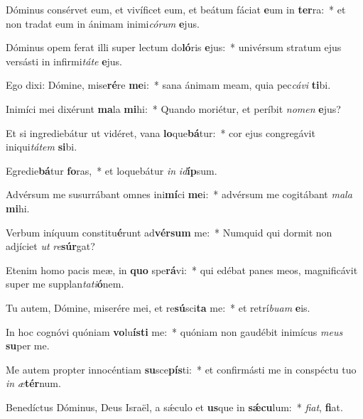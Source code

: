 \item Dóminus consérvet eum, et vivíficet eum, et beátum fáciat \textbf{e}um in \textbf{ter}ra:~* et non tradat eum in ánimam inimi\textit{có}\textit{rum} \textbf{e}jus.
\item Dóminus opem ferat illi super lectum do\textbf{ló}ris \textbf{e}jus:~* univérsum stratum ejus versásti in infirmi\textit{tá}\textit{te} \textbf{e}jus.
\item Ego dixi: Dómine, mise\textbf{ré}re \textbf{me}i:~* sana ánimam meam, quia pec\textit{cá}\textit{vi} \textbf{ti}bi.
\item Inimíci mei dixérunt \textbf{ma}la \textbf{mi}hi:~* Quando moriétur, et períbit \textit{no}\textit{men} \textbf{e}jus?
\item Et si ingrediebátur ut vidéret, vana \textbf{lo}que\textbf{bá}tur:~* cor ejus congregávit iniqui\textit{tá}\textit{tem} \textbf{si}bi.
\item Egredie\textbf{bá}tur \textbf{fo}ras,~* et loquebátur \textit{in} \textit{id}\textbf{íp}sum.
\item Advérsum me susurrábant omnes ini\textbf{mí}ci \textbf{me}i:~* advérsum me cogitábant \textit{ma}\textit{la} \textbf{mi}hi.
\item Verbum iníquum constitu\textbf{é}runt ad\textbf{vér}\textbf{sum} me:~* Numquid qui dormit non adjíciet \textit{ut} \textit{re}\textbf{súr}gat?
\item Etenim homo pacis meæ, in \textbf{quo} spe\textbf{rá}vi:~* qui edébat panes meos, magnificávit super me supplan\textit{ta}\textit{ti}\textbf{ó}nem.
\item Tu autem, Dómine, miserére mei, et re\textbf{sú}sci\textbf{ta} me:~* et retrí\textit{bu}\textit{am} \textbf{e}is.
\item In hoc cognóvi quóniam \textbf{vo}lu\textbf{ís}\textbf{ti} me:~* quóniam non gaudébit inimícus \textit{me}\textit{us} \textbf{su}per me.
\item Me autem propter innocéntiam \textbf{su}sce\textbf{pís}ti:~* et confirmásti me in conspéctu tuo \textit{in} \textit{æ}\textbf{tér}num.
\item Benedíctus Dóminus, Deus Israël, a sǽculo et \textbf{us}que in \textbf{sǽ}\textbf{cu}lum:~* \textit{fi}\textit{at}, \textbf{fi}at.
